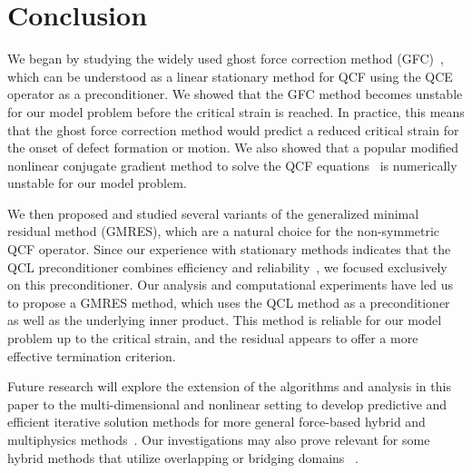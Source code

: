 \documentclass[12pt,reqno]{amsart}
\begin{document}
\section*{Conclusion}

We began by studying the widely used ghost force correction method
(GFC)~\cite{Shenoy:1999a}, which can be understood as a linear stationary method for QCF
using the QCE operator as a preconditioner. We showed that the GFC method
becomes unstable for our model problem before the critical strain
is reached. In practice, this means that the ghost force correction
method would predict a reduced critical strain for the onset of
defect formation or motion.  We also showed that a popular modified
nonlinear conjugate gradient method to solve the QCF equations~\cite{Miller:2008}
is numerically unstable for our model problem.

We then proposed and studied several variants of the generalized minimal
residual method (GMRES), which are a natural choice for the
non-symmetric QCF operator. Since our experience with stationary
methods indicates that the QCL preconditioner combines efficiency and
reliability~\cite{qcf.iterative}, we focused exclusively on this preconditioner. Our
analysis and computational experiments have led us to propose a GMRES
method, which uses the QCL method as a preconditioner as well as the
underlying inner product. This method is reliable for
our model problem up to the critical
strain, and the residual appears to offer a more effective termination criterion.

Future research will
explore the extension of the algorithms and analysis in this paper to
the multi-dimensional and nonlinear setting to develop predictive and
efficient iterative solution methods for more general force-based
hybrid and multiphysics
methods~\cite{hybrid_review,kohlhoff,cadd,Miller:2008}.
Our investigations may also prove relevant for some hybrid methods that
utilize overlapping or bridging domains
~\cite[see Method III]{BadiaParksBochevGunzburgerLehoucq:2007}.

\appendix
\end{document}

